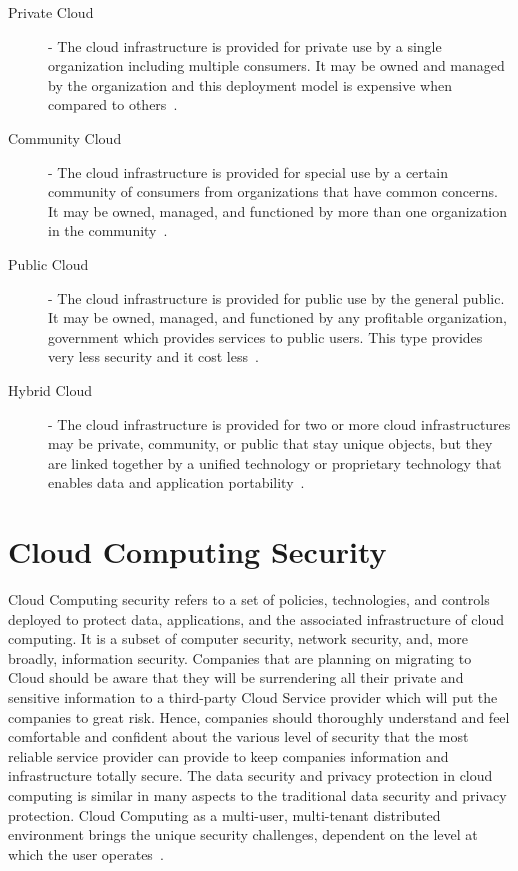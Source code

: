 \begin{description}


\item[Private Cloud]  - The cloud infrastructure is provided for private
use by a single organization including multiple consumers. It may be owned
and managed by the organization and this deployment model is expensive 
when compared to others~\cite{hid-sp18-513-cloud3}.

\item[Community Cloud] - The cloud infrastructure is provided for special use
by a certain community of consumers from organizations that have  common 
concerns. It may be owned, managed, and functioned by more than one 
organization in the community~\cite{hid-sp18-513-cloud3}.

\item[Public Cloud] - The cloud infrastructure is provided for public use by 
the general public. It may be owned, managed, and functioned by any  profitable 
organization, government which provides services to public users. This type 
provides very less security and it cost less~\cite{hid-sp18-513-cloud3}.

\item[Hybrid Cloud] -  The cloud infrastructure is provided for two or more cloud 
infrastructures may be private, community, or public that stay unique  objects, 
but they are linked together by a unified technology or proprietary technology
that enables data and application portability~\cite{hid-sp18-513-cloud3}.

  
\end{description}

\section{Cloud Computing Security}
Cloud Computing security refers to a set of policies, technologies, 
and controls deployed to protect data, applications, and the associated
infrastructure of cloud computing. It is a subset of computer security, 
network security, and, more broadly, information security. Companies that
are planning on migrating to Cloud should be aware that they will be 
surrendering all their private and sensitive information to a third-party
Cloud Service provider which will put the companies to great risk. Hence, 
companies should thoroughly understand and feel comfortable and confident
about the various level of security that the most reliable service provider
can provide to keep companies information and infrastructure 
totally secure.
The data security and privacy protection in cloud computing is similar in 
many aspects to the traditional data security and privacy protection. 
Cloud Computing as a multi-user, multi-tenant distributed environment brings 
the unique security challenges, dependent on the level at which
the user operates~\cite{hid-sp18-513-zissis2012addressing}.

